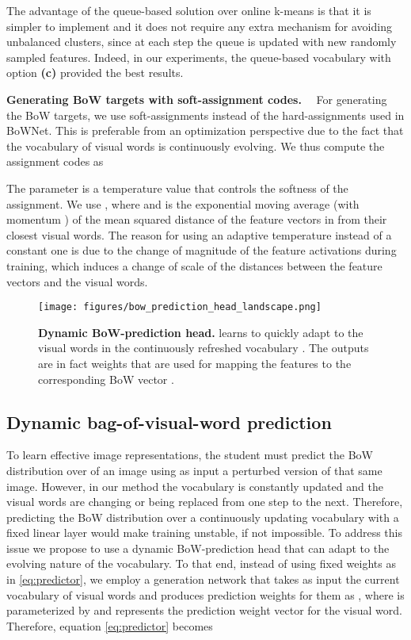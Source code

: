 \documentclass[final]{cvpr}
\newcommand{\parag}[1]{\smallskip\noindent\textbf{#1}~~}
\begin{document}
The advantage of the queue-based solution over online k-means is that it is simpler to implement and it does not require any extra mechanism for avoiding unbalanced clusters, since at each step the queue is updated with new randomly sampled features. 
Indeed, in our experiments, the queue-based vocabulary with option \textbf{(c)} provided the best results.


\parag{Generating BoW targets with soft-assignment codes.} 
For generating the BoW targets, we use soft-assignments instead of the hard-assignments used in BoWNet. 
This is preferable from an optimization perspective due to the fact that the vocabulary of visual words is continuously evolving.
We thus compute the assignment codes  as

The parameter  is a temperature value that controls the softness of the assignment.
We use , where  and   is the exponential moving average (with momentum ) of the mean squared distance of the feature vectors in  from their closest visual words. 
The reason for using an adaptive temperature instead of a constant one is due to the change of magnitude of the feature activations during training, which induces a change of scale of the distances between the feature vectors and the visual words.

\begin{figure}[t!]
\renewcommand{\captionfont}{\small}
\renewcommand{\captionlabelfont}{\bf}
\centering
\texttt{[image: figures/bow\_prediction\_head\_landscape.png]}
\vspace{-10pt}
\caption{\textbf{Dynamic BoW-prediction head.}  learns to quickly adapt to the visual words in the continuously refreshed vocabulary . The outputs  are in fact weights that are used for mapping the features  to the corresponding BoW vector .
}
\label{fig:bow_prediction_head}
\end{figure}

\subsection{Dynamic bag-of-visual-word prediction} \label{sec:dynamic_bow_prediction}

To learn effective image representations, the student must predict the BoW distribution over  of an image using as input a perturbed version of that same image.
However, in our method the vocabulary is constantly updated and the visual words are changing or being replaced from one step to the next.
Therefore, predicting the BoW distribution over a continuously updating vocabulary  with a fixed linear layer would make training unstable, if not impossible. 
To address this issue we propose to use a dynamic BoW-prediction head that can adapt to the evolving nature of the vocabulary.
To that end, instead of using fixed weights as in \eqref{eq:predictor}, we employ a generation network  that takes as input the current vocabulary of visual words  and produces prediction weights for them as , where  is parameterized by  and  represents the prediction weight vector for the  visual word.
Therefore, equation \eqref{eq:predictor} becomes
\end{document}
